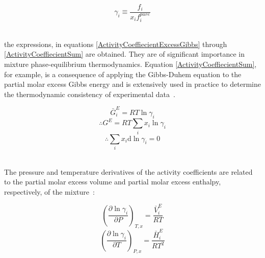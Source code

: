 \begin{equation}
\gamma_{i} \equiv \frac{f_{i}}{x_{i}f_{i}^{pure}}
\end{equation}\

the expressions, in equations \ref{ActivityCoeffiecientExcessGibbs} through \ref{ActivityCoeffiecientSum} are obtained. They are of significant importance in mixture phase-equilibrium thermodynamics. Equation \ref{ActivityCoeffiecientSum}, for example, is a consequence of applying the Gibbs-Duhem equation to the partial molar excess Gibbs energy and is extensively used in practice to determine the thermodynamic consistency of experimental data~\cite{MolecularThermodynamicsOfFluidPhaseEquilibria, SmithNessAbbott, ThermodynamicModels}.\

\begin{equation}
\bar{G}_{i}^{E}  = RT \ln \gamma_{i}\label{ActivityCoeffiecientExcessGibbs}
\end{equation}
\begin{equation}
\therefore G^{E} = RT\sum_{i} x_{i} \ln \gamma_{i} 
\end{equation}
\begin{equation}
\therefore \sum_{i} x_{i}\mathrm{d}\ln \gamma_{i}  = 0 \label{ActivityCoeffiecientSum}
\end{equation}\

The pressure and temperature derivatives of the activity coefficients are related to the partial molar excess volume and partial molar excess enthalpy, respectively, of the mixture~\cite{MolecularThermodynamicsOfFluidPhaseEquilibria}:\

\begin{equation}
\left(\frac{\partial \ln \gamma_{i}}{\partial P}\right)_{T,x} = \frac{\bar{V}_{i}^{E}}{RT}
\end{equation}
\begin{equation}
\left(\frac{\partial \ln \gamma_{i}}{\partial T}\right)_{P,x} = \frac{\bar{H}_{i}^{E}}{RT^{2}}
\end{equation}\



